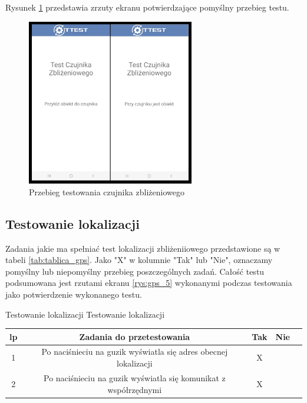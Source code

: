 Rysunek \ref{rys:zblizeniowy} przedstawia zrzuty ekranu potwierdzające pomyślny przebieg testu.

\begin{figure}[!hbt]
	\begin{center}
		\includegraphics[angle=360, width=0.65\textwidth]{rys/punkt5/zblizeniowy.png}
		\caption{Przebieg testowania czujnika zbliżeniowego}
		\label{rys:zblizeniowy}
	\end{center}
\end{figure}   

\newpage


\subsection{Testowanie lokalizacji}

\hspace{0.60cm}Zadania jakie ma spełniać test lokalizacji zbliżeniiowego przedstawione są w tabeli \ref{tab:tablica_gps}. Jako "X" w kolumnie "Tak" lub "Nie", oznaczamy pomyślny lub niepomyślny przebieg poszczególnych zadań. Całość testu podsumowana jest rzutami ekranu \ref{rys:gps_5} wykonanymi podczas testowania jako potwierdzenie wykonanego testu.

\begin{tabela}
	{Testowanie lokalizacji}	%
	{Testowanie lokalizacji}	%
	{
		\begin{tabular}{|c|c|c|c|c|} \hline
			\textbf{lp} & \textbf{Zadania do przetestowania} & \textbf{Tak} & \textbf{Nie} \\ \hline
			1 & Po naciśnieciu na guzik wyświatla się adres obecnej lokalizacji  & X & ~ \\ \hline
			2 & Po naciśnieciu na guzik wyświatla się komunikat z współrzędnymi & X & ~ \\ \hline
	\end{tabular}	}
	\label{tab:tablica_gps}
\end{tabela}

